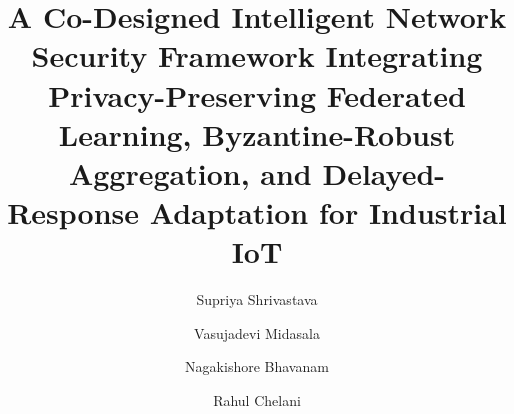 \documentclass[preprint,12pt]{elsarticle}
\begin{document}
\begin{frontmatter}

\title{A Co-Designed Intelligent Network Security Framework Integrating Privacy-Preserving Federated Learning, Byzantine-Robust Aggregation, and Delayed-Response Adaptation for Industrial IoT}

\author[inst1]{Supriya Shrivastava}
\author[inst1]{Vasujadevi Midasala}
\author[inst1]{Nagakishore Bhavanam}
\author[inst2]{Rahul Chelani}




\end{frontmatter}
\end{document}
